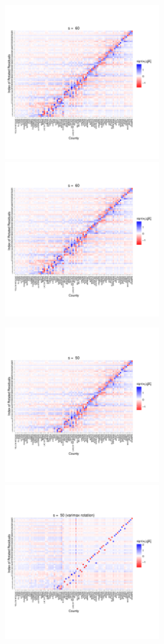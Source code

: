 \documentclass{article} %
\begin{document}
\includegraphics[width=0.5\textwidth]{RandomIntercept_s60.pdf}
\includegraphics[width=0.5\textwidth]{RandomIntercept_s60_varimax.pdf}

\includegraphics[width=0.5\textwidth]{RandomIntercept_s50.pdf}
\includegraphics[width=0.5\textwidth]{RandomIntercept_s50_varimax.pdf}
\end{document}
